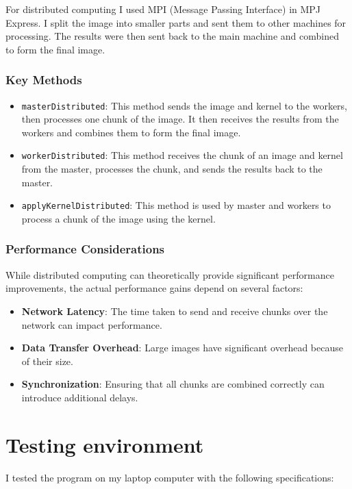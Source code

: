\documentclass{article}
\begin{document}
\begin{multicols}{2}
    For distributed computing I used MPI (Message Passing Interface) in MPJ Express. I split the image into smaller parts and sent them to other machines for processing. The results were then sent back to the main machine and combined to form the final image.

    \subsubsection{Key Methods}

    \begin{itemize}
        \item \texttt{masterDistributed}: This method sends the image and kernel to the workers, then processes one chunk of the image. It then receives the results from the workers and combines them to form the final image.

        \item \texttt{workerDistributed}: This method receives the chunk of an image and kernel from the master, processes the chunk, and sends the results back to the master.

        \item \texttt{applyKernelDistributed}: This method is used by master and workers to process a chunk of the image using the kernel.

    \end{itemize}

    \subsubsection{Performance Considerations}

    While distributed computing can theoretically provide significant performance improvements, the actual performance gains depend on several factors:
    \begin{itemize}
        \item \textbf{Network Latency}: The time taken to send and receive chunks over the network can impact performance.
        \item \textbf{Data Transfer Overhead}: Large images have significant overhead because of their size.
        \item \textbf{Synchronization}: Ensuring that all chunks are combined correctly can introduce additional delays.
    \end{itemize}

    \section{Testing environment}
    I tested the program on my laptop computer with the following specifications:


\end{multicols}
\end{document}
